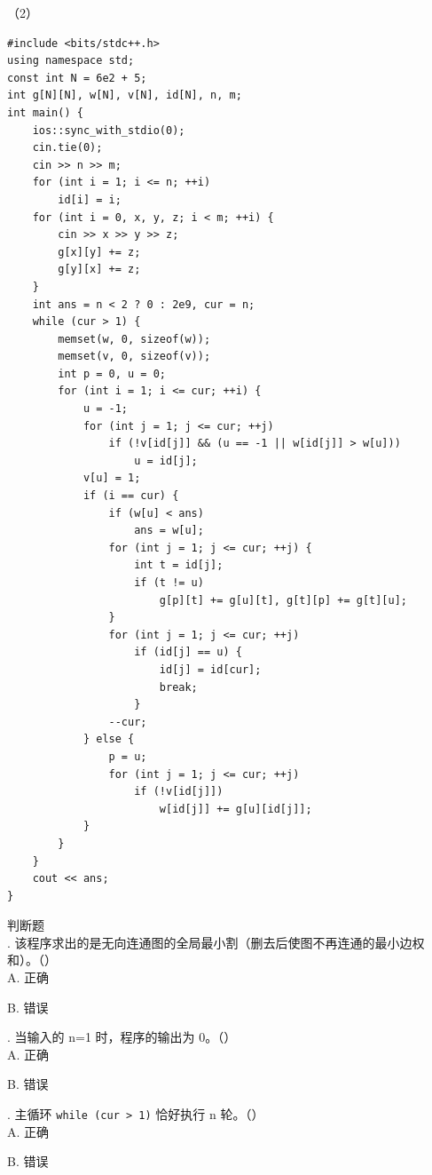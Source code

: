 \documentclass[a4paper]{ctexart}
\newcommand{\wdot}{{\wingdingsfont\fontsize{12}{12}\selectfont\XeTeXglyph122\relax}}
\newcommand{\q}[1]{\noindent #1}
\newcommand{\opt}[1]{\hspace*{2em} #1\par}
\begin{document}
\clearpage
\noindent（2）
\begin{codebox}
\begin{lstlisting}
#include <bits/stdc++.h>
using namespace std;
const int N = 6e2 + 5;
int g[N][N], w[N], v[N], id[N], n, m;
int main() {
    ios::sync_with_stdio(0);
    cin.tie(0);
    cin >> n >> m;
    for (int i = 1; i <= n; ++i)
        id[i] = i;
    for (int i = 0, x, y, z; i < m; ++i) {
        cin >> x >> y >> z;
        g[x][y] += z;
        g[y][x] += z;
    }
    int ans = n < 2 ? 0 : 2e9, cur = n;
    while (cur > 1) {
        memset(w, 0, sizeof(w));
        memset(v, 0, sizeof(v));
        int p = 0, u = 0;
        for (int i = 1; i <= cur; ++i) {
            u = -1;
            for (int j = 1; j <= cur; ++j)
                if (!v[id[j]] && (u == -1 || w[id[j]] > w[u]))
                    u = id[j];
            v[u] = 1;
            if (i == cur) {
                if (w[u] < ans)
                    ans = w[u];
                for (int j = 1; j <= cur; ++j) {
                    int t = id[j];
                    if (t != u)
                        g[p][t] += g[u][t], g[t][p] += g[t][u];
                }
                for (int j = 1; j <= cur; ++j)
                    if (id[j] == u) {
                        id[j] = id[cur];
                        break;
                    }
                --cur;
            } else {
                p = u;
                for (int j = 1; j <= cur; ++j)
                    if (!v[id[j]])
                        w[id[j]] += g[u][id[j]];
            }
        }
    }
    cout << ans;
}
\end{lstlisting}
\end{codebox}

\noindent\wdot\hspace{0.5em}判断题\\
\q{21.} 该程序求出的是无向连通图的全局最小割（删去后使图不再连通的最小边权和）。（\qquad）\\
\opt{A. 正确}
\opt{B. 错误}
\q{22.} 当输入的 n=1 时，程序的输出为 0。（\qquad）\\
\opt{A. 正确}
\opt{B. 错误}
\q{23.} 主循环 \texttt{while (cur > 1)} 恰好执行 n 轮。（\qquad）\\
\opt{A. 正确}
\opt{B. 错误}
\end{document}
